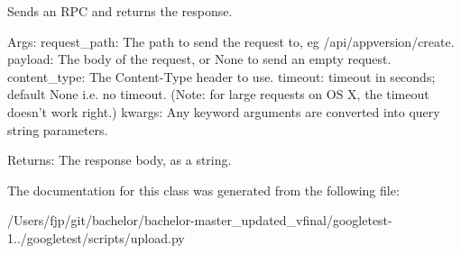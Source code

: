 \begin{DoxyVerb}Sends an RPC and returns the response.

Args:
  request_path: The path to send the request to, eg /api/appversion/create.
  payload: The body of the request, or None to send an empty request.
  content_type: The Content-Type header to use.
  timeout: timeout in seconds; default None i.e. no timeout.
(Note: for large requests on OS X, the timeout doesn't work right.)
  kwargs: Any keyword arguments are converted into query string parameters.

Returns:
  The response body, as a string.
\end{DoxyVerb}
 

The documentation for this class was generated from the following file\+:\begin{DoxyCompactItemize}
\item 
/\+Users/fjp/git/bachelor/bachelor-\/master\+\_\+updated\+\_\+vfinal/googletest-\/1../googletest/scripts/upload.\+py\end{DoxyCompactItemize}
